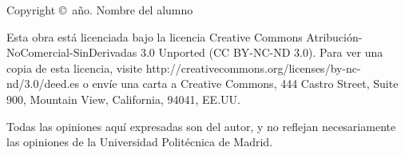 \begin{flushleft}

Copyright \copyright\ año. Nombre del alumno


Esta obra está licenciada bajo la licencia Creative Commons Atribución-NoComercial-SinDerivadas 3.0 Unported (CC BY-NC-ND 3.0). Para ver una copia de esta licencia, visite http://creativecommons.org/licenses/by-nc-nd/3.0/deed.es o envíe una carta a Creative Commons, 444 Castro Street, Suite 900, Mountain View, California, 94041, EE.UU.

Todas las opiniones aquí expresadas son del autor, y no reflejan necesariamente las opiniones
de la Universidad Politécnica de Madrid.

\end{flushleft}